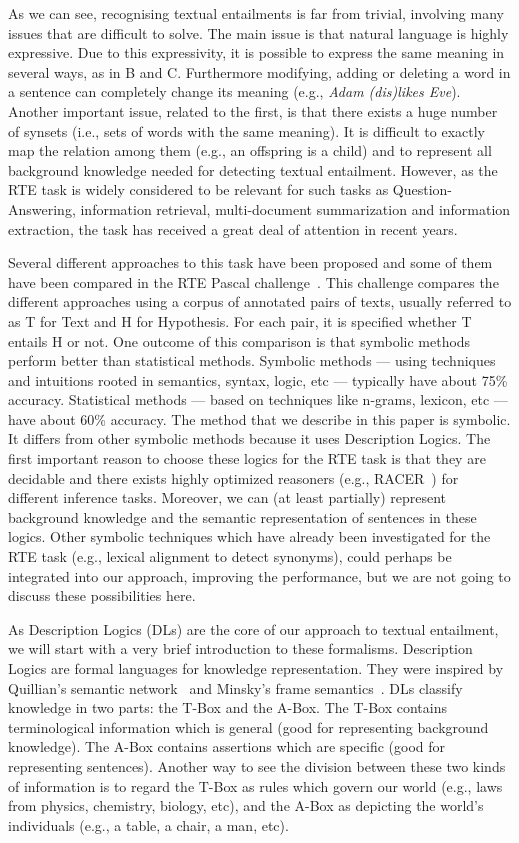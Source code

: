 \documentclass{esslli}
\begin{document}
As we can see, recognising textual entailments is far from trivial,
involving many issues that are difficult to solve. The main issue is
that natural language is highly expressive. Due to this expressivity,
it is possible to express the same meaning in several ways, as in B
and C. Furthermore modifying, adding or deleting a word in a sentence
can completely change its meaning (e.g., \emph{Adam (dis)likes
Eve}). Another important issue, related to the first, is that there
exists a huge number of synsets (i.e., sets of words with the same
meaning). It is difficult to exactly map the relation among them
(e.g., an offspring is a child) and to represent all background
knowledge needed for detecting textual entailment.  However, as the
RTE task is widely considered to be relevant for such tasks as
Question-Answering, information retrieval, multi-document
summarization and information extraction, the task has received a
great deal of attention in recent years.

Several different approaches to this task have been proposed and some
of them have been compared in the RTE Pascal
challenge~\cite{DBLP:conf/mlcw/DaganGM05}. This challenge compares the
different approaches using a corpus of annotated pairs of texts,
usually referred to as T for Text and H for Hypothesis. For each pair,
it is specified whether T entails H or not. One outcome of this
comparison is that symbolic methods perform better than statistical
methods. Symbolic methods --- using techniques and intuitions rooted
in semantics, syntax, logic, etc --- typically have about 75\%
accuracy. Statistical methods --- based on techniques like n-grams,
lexicon, etc --- have about 60\% accuracy. The method that we describe
in this paper is symbolic. It differs from other symbolic methods
because it uses Description Logics. The first important reason to
choose these logics for the RTE task is that they are decidable and
there exists highly optimized reasoners (e.g., RACER~\cite{HaMo01e})
for different inference tasks. Moreover, we can (at least partially)
represent background knowledge and the semantic representation of
sentences in these logics. Other symbolic techniques which have
already been investigated for the RTE task (e.g., lexical alignment to
detect synonyms), could perhaps be integrated into our approach,
improving the performance, but we are not going to discuss these
possibilities here.

\medskip
As Description Logics (DLs) are the core of our approach to textual
entailment, we will start with a very brief introduction to these
formalisms. Description Logics are formal languages for
knowledge representation. They were inspired by Quillian's semantic
network~\cite{Quillian88} and Minsky's frame
semantics~\cite{Minsky74}. DLs classify knowledge in two
parts: the T-Box and the A-Box. The T-Box contains terminological
information which is general (good for representing background
knowledge). The A-Box contains assertions which are specific (good for
representing sentences). Another way to see the division between these
two kinds of information is to regard the T-Box as rules which govern
our world (e.g., laws from physics, chemistry, biology, etc), and the
A-Box as depicting the world's individuals (e.g., a table, a chair, a
man, etc).
\end{document}
